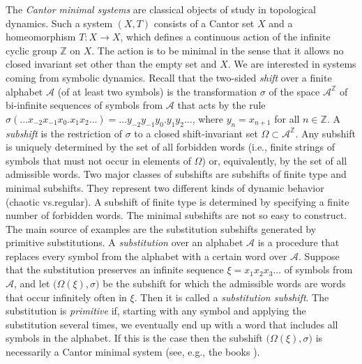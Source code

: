 \documentclass[12pt]{article}
\theoremstyle{definition}
\def\bZ{\mathbb{Z}}
\def\cA{\mathcal{A}}
\def\si{\sigma}
\def\Om{\Omega}
\begin{document}
The \emph{Cantor minimal systems} are classical objects of study in 
topological dynamics.  Such a system $(X,T)$ consists of a Cantor set $X$ 
and a homeomorphism $T:X\to X$, which defines a continuous action of the 
infinite cyclic group $\bZ$ on $X$.  The action is to be minimal in the 
sense that it allows no closed invariant set other than the empty set and 
$X$.  We are interested in systems coming from symbolic dynamics.  Recall 
that the two-sided \emph{shift} over a finite alphabet $\cA$ (of at least 
two symbols) is the transformation $\si$ of the space $\cA^{\bZ}$ of 
bi-infinite sequences of symbols from $\cA$ that acts by the rule 
$\si(\ldots x_{-2}x_{-1}x_0.x_1x_2\ldots)=\ldots 
y_{-2}y_{-1}y_0.y_1y_2\ldots$, where $y_n=x_{n+1}$ for all $n\in\bZ$.
A \emph{subshift} is the restriction of $\si$ to a closed shift-invariant 
set $\Om\subset\cA^{\bZ}$.  Any subshift is uniquely determined by the set 
of all forbidden words (i.e., finite strings of symbols that must not occur 
in elements of $\Om$) or, equivalently, by the set of all admissible 
words.  Two major classes of subshifts are subshifts of finite type and 
minimal subshifts.  They represent two different kinds of dynamic behavior 
(chaotic vs.\@ regular).  A subshift of finite type is determined by 
specifying a finite number of forbidden words.  The minimal subshifts are 
not so easy to construct.  The main source of examples are the substitution 
subshifts generated by primitive substitutions.  A \emph{substitution} over 
an alphabet $\cA$ is a procedure that replaces every symbol from the 
alphabet with a certain word over $\cA$.  Suppose that the substitution 
preserves an infinite sequence $\xi=x_1x_2x_3\ldots$ of symbols from $\cA$, 
and let $\bigl(\Om(\xi),\si\bigr)$ be the subshift for which the admissible 
words are words that occur infinitely often in $\xi$.  Then it is called a 
\emph{substitution subshift}.  The substitution is \emph{primitive} if, 
starting with any symbol and applying the substitution several times, we 
eventually end up with a word that includes all symbols in the alphabet.  
If this is the case then the subshift $\bigl(\Om(\xi),\si\bigr)$ is 
necessarily a Cantor minimal system (see, e.g., the books 
\cite{AlloucheShallit:automatic, Fogg:substitutions, LindMarcus}). 
\end{document}

